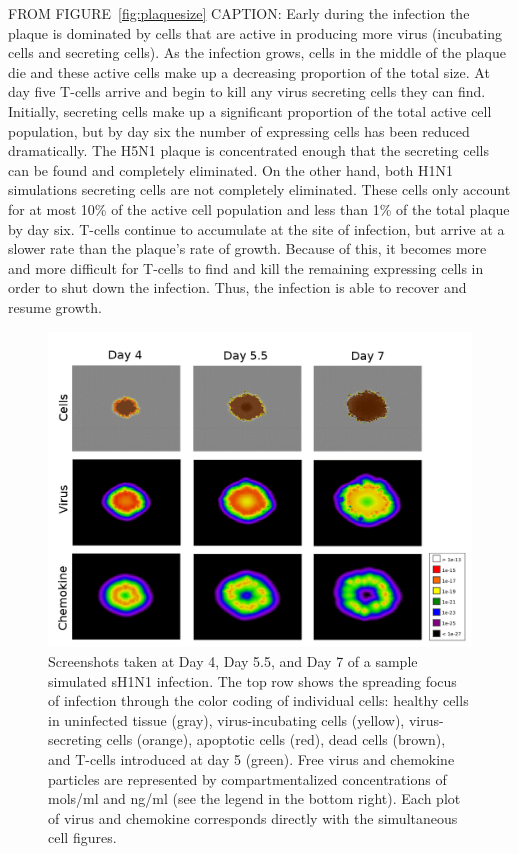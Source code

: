 \documentclass[10pt]{article}
\begin{document}
FROM FIGURE~\ref{fig:plaquesize} CAPTION: Early during the infection the plaque is dominated by cells that are active in producing more virus (incubating cells and secreting cells).  As the infection grows, cells in the middle of the plaque die and these active cells make up a decreasing proportion of the total size. At day five T-cells arrive and begin to kill any virus secreting cells they can find.  Initially, secreting cells make up a significant proportion of the total active cell population, but by day six the number of expressing cells has been reduced dramatically.   The H5N1 plaque is concentrated enough that the secreting cells can be found and completely eliminated.  On the other hand, both H1N1 simulations secreting cells are not completely eliminated.  These cells only account for at most 10\% of the active cell population and less than  1\% of the total plaque by day six.  T-cells continue to accumulate at the site of infection, but arrive at a slower rate than the plaque's rate of growth.  Because of this, it becomes more and more difficult for T-cells to find and kill the remaining expressing cells in order to shut down the infection.  Thus, the infection is able to recover and resume growth. 

\begin{figure}[ht!]
\begin{center}
 \includegraphics[width=\textwidth]{cycells}
 \end{center}
\caption{Screenshots taken at Day 4, Day 5.5, and Day 7 of a sample simulated sH1N1 infection.  The top row shows the spreading focus of infection  through the color coding of individual cells:  healthy cells in uninfected tissue (gray),  virus-incubating cells (yellow), virus-secreting cells (orange), apoptotic cells (red), dead cells (brown), and T-cells introduced at day 5 (green).  Free virus and chemokine particles are represented by compartmentalized concentrations of mols/ml and ng/ml (see the legend in the bottom right).  Each plot of virus and chemokine corresponds directly with the simultaneous cell figures.} 
 \label{fig:cycells}
\end{figure}
\end{document}
